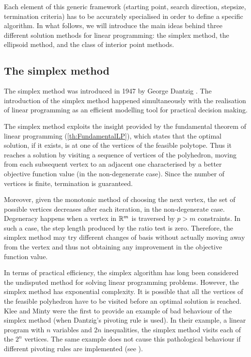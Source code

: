 Each element of this generic framework
(starting point, search direction, stepsize, termination criteria)
has to be accurately specialised in order to define a specific algorithm.
In what follows, we will introduce the main ideas behind three 
different solution methods for linear programming: the simplex method,
the ellipsoid method, and the class of interior point methods.

%
%
\subsection{The simplex method}

The simplex method was introduced in 1947 by George Dantzig 
\cite{Dantzig63}. The
introduction of the simplex method happened simultaneously with
the realisation of linear programming as an efficient modelling tool
for practical decision making. 

The simplex method exploits the insight provided by the fundamental 
theorem of linear programming (\ref{th:FundamentalLP}), which states that
the optimal solution, if it exists, is at one of the vertices
of the feasible polytope.
Thus it reaches a solution by visiting a sequence of 
vertices of the polyhedron, moving from each subsequent vertex to an adjacent 
one characterised by a better objective function value
(in the non-degenerate case). 
Since the number of vertices is finite, termination is guaranteed.

Moreover, given the monotonic
method of choosing the next vertex, the set of possible vertices 
decreases after each iteration, in the non-degenerate case.
Degeneracy
happens when a vertex in $\mathbb{R}^m$ is traversed by $p > m$ constraints.
In such a case, the step length produced by the ratio test
is zero. Therefore, the simplex method
may try different changes of basis without actually moving away
from the vertex and thus not obtaining any improvement in the objective
function value.


In terms of practical efficiency, the simplex algorithm has 
long been considered the undisputed method for solving linear programming
problems.
However, the simplex method has exponential complexity. It is possible that all
the vertices of the feasible polyhedron have to be visited
before an optimal solution is reached.
Klee and Minty \cite{KleeMinty} were the first to provide an example 
of bad behaviour of the simplex method (when Dantzig's pivoting rule 
is used). In their example, a linear program with $n$ variables 
and $2n$ inequalities,
the simplex method visits each of the $2^n$ vertices.
The same example does not cause this pathological behaviour if different
pivoting rules are implemented (see \cite[Chapter~4]{lp:Chvatal}).

